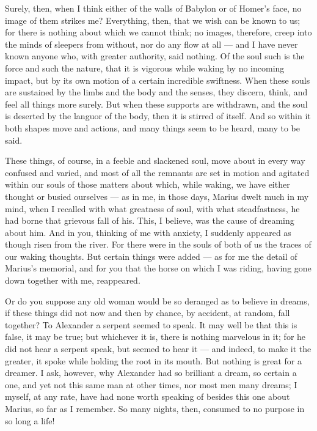  Surely, then, when I think either of the walls of Babylon or of Homer's face, no image of them strikes me? Everything, then, that we wish can be known to us; for there is nothing about which we cannot think; no images, therefore, creep into the minds of sleepers from without, nor do any flow at all — and I have never known anyone who, with greater authority, said nothing. Of the soul such is the force and such the nature, that it is vigorous while waking by no incoming impact, but by its own motion of a certain incredible swiftness. When these souls are sustained by the limbs and the body and the senses, they discern, think, and feel all things more surely. But when these supports are withdrawn, and the soul is deserted by the languor of the body, then it is stirred of itself. And so within it both shapes move and actions, and many things seem to be heard, many to be said.

 These things, of course, in a feeble and slackened soul, move about in every way confused and varied, and most of all the remnants are set in motion and agitated within our souls of those matters about which, while waking, we have either thought or busied ourselves — as in me, in those days, Marius dwelt much in my mind, when I recalled with what greatness of soul, with what steadfastness, he had borne that grievous fall of his. This, I believe, was the cause of dreaming about him. And in you, thinking of me with anxiety, I suddenly appeared as though risen from the river. For there were in the souls of both of us the traces of our waking thoughts. But certain things were added — as for me the detail of Marius's memorial, and for you that the horse on which I was riding, having gone down together with me, reappeared.

 Or do you suppose any old woman would be so deranged as to believe in dreams, if these things did not now and then by chance, by accident, at random, fall together? To Alexander a serpent seemed to speak. It may well be that this is false, it may be true; but whichever it is, there is nothing marvelous in it; for he did not hear a serpent speak, but seemed to hear it — and indeed, to make it the greater, it spoke while holding the root in its mouth. But nothing is great for a dreamer. I ask, however, why Alexander had so brilliant a dream, so certain a one, and yet not this same man at other times, nor most men many dreams; I myself, at any rate, have had none worth speaking of besides this one about Marius, so far as I remember. So many nights, then, consumed to no purpose in so long a life!

